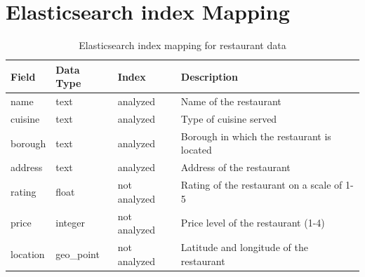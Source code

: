 \documentclass[12pt]{article}
\begin{document}
    \section{Elasticsearch index Mapping}
    \begin{table}[h!]
        \centering
        \begin{tabular}{ llll } 
         \hline
         \textbf{Field} & \textbf{Data Type} & \textbf{Index} & \textbf{Description} \\
         \hline
         name & text & analyzed & Name of the restaurant \\
         \hline
         cuisine & text & analyzed & Type of cuisine served \\
         \hline
         borough & text & analyzed & Borough in which the restaurant is located \\
         \hline
         address & text & analyzed & Address of the restaurant \\
         \hline
         rating & float & not analyzed & Rating of the restaurant on a scale of 1-5 \\
         \hline
         price & integer & not analyzed & Price level of the restaurant (1-4) \\
         \hline
         location & geo\_point & not analyzed & Latitude and longitude of the restaurant \\
         \hline
        \end{tabular}
        \caption{Elasticsearch index mapping for restaurant data}
        \label{table:elasticsearch-index-mapping}
        \end{table}
\end{document}
